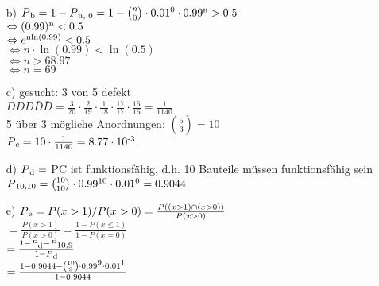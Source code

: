 \documentclass[a4paper]{article}
\begin{document}
\begin{description}
\begin{itemize}
			\item[b)]	$P\textsubscript{b}= 1-P\textsubscript{n, 0}= 1-{{n}\choose{0}} \cdot 0.01\textsuperscript{0} \cdot 0.99\textsuperscript{n} > 0.5$\\
			$\Leftrightarrow (0.99)\textsuperscript{n} < 0.5$\\
			$\Leftrightarrow e\textsuperscript{nln(0.99)} < 0.5$\\
			$\Leftrightarrow n \cdot \ln(0.99) < \ln(0.5)$\\
			$\Leftrightarrow n > 68.97$\\
			$\Leftrightarrow n= 69$\\
			
			\item[c)] gesucht: 3 von 5 defekt\\
			
								$DDD\bar{D}\bar{D}=\frac{3}{20} \cdot \frac{2}{19} \cdot \frac{1}{18} \cdot \frac{17}{17} \cdot \frac{16}{16}= \frac{1}{1140}$\\
								
								5 über 3 mögliche Anordnungen: ${{5}\choose{3}}=10$\\
								
								$P\textsubscript{c}= 10 \cdot \frac{1}{1140}= 8.77\cdot 10\textsuperscript{-3}$ \\
								
			
			\item[d)] $P\textsubscript{d}=$ PC ist funktionsfähig, d.h. 10 Bauteile müssen funktionsfähig sein\\
								
								$P\textsubscript{10,10}= {{10}\choose{10}}\cdot 0.99\textsuperscript{10} \cdot 0.01\textsuperscript{0}= 0.9044$\\
								
			\item[e)] $P\textsubscript{e}= P(x>1)/P(x>0)= \frac{P((x>1)\cap(x>0))}{P(x>0)}$\\
								
								$=\frac{P(x>1)}{P(x>0)}= \frac{1-P(x\leq 1)}{1-P(x=0)}$\\
								
								$=\frac{1-P\textsubscript{d}-P\textsubscript{10,9}}{1-P\textsubscript{d}}$\\
								
								$=\frac{1-0.9044-{{10}\choose{9}}\cdot 0.99\textsuperscript{9} \cdot 0.01\textsuperscript{1}}{1-0.9044}$\\
								

\end{itemize}
\end{description}
\end{document}
